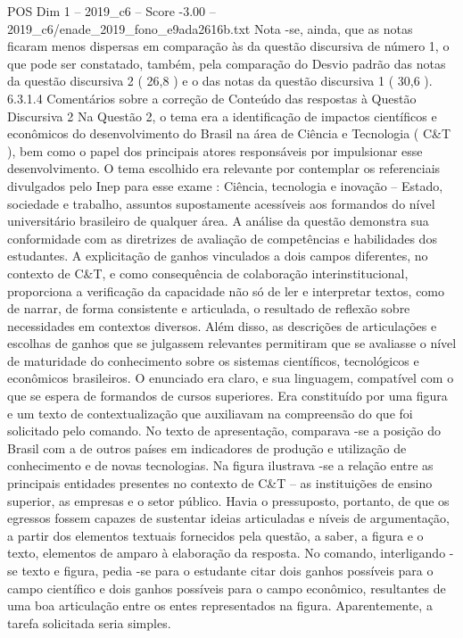 \begin{textsample}{POS Dim 1 – 2019\_c6 – Score -3.00 – 2019\_c6/enade\_2019\_fono\_e9ada2616b.txt}
Nota -se, ainda, que as notas ficaram menos dispersas em comparação às da questão discursiva de número 1, o que pode ser constatado, também, pela comparação do Desvio padrão das notas da questão discursiva 2 ( 26,8 ) e o das notas da questão discursiva 1 ( 30,6 ). 6.3.1.4 Comentários sobre a correção de Conteúdo das respostas à Questão Discursiva 2 Na Questão 2, o tema era a identificação de impactos científicos e econômicos do desenvolvimento do Brasil na área de Ciência e Tecnologia ( C\&T ), bem como o papel dos principais atores responsáveis por impulsionar esse desenvolvimento.
O tema escolhido era relevante por contemplar os referenciais divulgados pelo Inep para esse exame : Ciência, tecnologia e inovação – Estado, sociedade e trabalho, assuntos supostamente acessíveis aos formandos do nível universitário brasileiro de qualquer área.
A análise da questão demonstra sua conformidade com as diretrizes de avaliação de competências e habilidades dos estudantes.
A explicitação de ganhos vinculados a dois campos diferentes, no contexto de C\&T, e como consequência de colaboração interinstitucional, proporciona a verificação da capacidade não só de ler e interpretar textos, como de narrar, de forma consistente e articulada, o resultado de reflexão sobre necessidades em contextos diversos.
Além disso, as descrições de articulações e escolhas de ganhos que se julgassem relevantes permitiram que se avaliasse o nível de maturidade do conhecimento sobre os sistemas científicos, tecnológicos e econômicos brasileiros.
O enunciado era claro, e sua linguagem, compatível com o que se espera de formandos de cursos superiores.
Era constituído por uma figura e um texto de contextualização que auxiliavam na compreensão do que foi solicitado pelo comando.
No texto de apresentação, comparava -se a posição do Brasil com a de outros países em indicadores de produção e utilização de conhecimento e de novas tecnologias.
Na figura ilustrava -se a relação entre as principais entidades presentes no contexto de C\&T – as instituições de ensino superior, as empresas e o setor público.
Havia o pressuposto, portanto, de que os egressos fossem capazes de sustentar ideias articuladas e níveis de argumentação, a partir dos elementos textuais fornecidos pela questão, a saber, a figura e o texto, elementos de amparo à elaboração da resposta.
No comando, interligando -se texto e figura, pedia -se para o estudante citar dois ganhos possíveis para o campo científico e dois ganhos possíveis para o campo econômico, resultantes de uma boa articulação entre os entes representados na figura.
Aparentemente, a tarefa solicitada seria simples.

\end{textsample}
